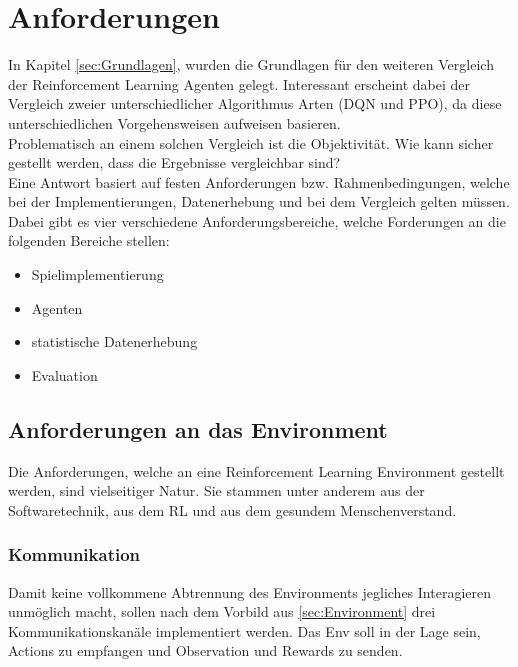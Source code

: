 \chapter{Anforderungen} \label{chap:Anforderungen}
In Kapitel \ref{sec:Grundlagen}, wurden die Grundlagen für den weiteren Vergleich der Reinforcement Learning Agenten gelegt. Interessant erscheint dabei der Vergleich zweier unterschiedlicher Algorithmus Arten (DQN und PPO), da diese unterschiedlichen Vorgehensweisen aufweisen basieren. \\
Problematisch an einem solchen Vergleich ist die Objektivität. Wie kann sicher gestellt werden, dass die Ergebnisse vergleichbar sind?\\
Eine Antwort basiert auf festen Anforderungen bzw. Rahmenbedingungen, welche bei der Implementierungen, Datenerhebung und bei dem Vergleich gelten müssen. Dabei gibt es vier verschiedene Anforderungsbereiche, welche Forderungen an die folgenden Bereiche stellen:
\begin{itemize}
	\item Spielimplementierung
	\item Agenten
	\item statistische Datenerhebung
	\item Evaluation
\end{itemize}

\section{Anforderungen an das Environment}
Die Anforderungen, welche an eine Reinforcement Learning Environment gestellt werden, sind vielseitiger Natur. Sie stammen unter anderem aus der Softwaretechnik, aus dem RL und aus dem gesundem Menschenverstand.

\subsection{Kommunikation}
Damit keine vollkommene Abtrennung des Environments jegliches Interagieren unmöglich macht, sollen nach dem Vorbild aus \ref{sec:Environment} drei Kommunikationskanäle implementiert werden. Das Env soll in der Lage sein, Actions zu empfangen und Observation und Rewards zu senden.

